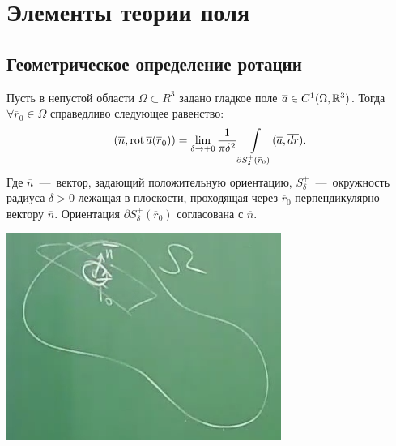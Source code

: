 \section{Элементы теории поля}
\subsection{Геометрическое определение ротации}
\noindent 
    \begin{minipage}{0.75\textwidth}
   \begin{theorem}
    Пусть в непустой области $\Omega \subset R^3$ задано гладкое поле $\overline{a} \in C^1 (\Omega, \mathbb{R}^3)$. Тогда $\forall \overline{r}_0 \in \Omega$ справедливо следующее равенство: \[ (\overline{n}, \operatorname{rot} \overline{a}(\overline{r}_0)) = \lim\limits_{\delta \rightarrow +0} \dfrac{1}{\pi \delta^2} \int\limits_{\partial S^+_\delta(\overline{r}_0)} (\overline{a}, \overline{dr}).\]
    Где $\overline{n}$~---~вектор, задающий положительную ориентацию, $S^+_\delta$~---~окружность радиуса $\delta > 0$ лежащая в плоскости, проходящая через $\overline{r}_0$ перпендикулярно вектору $\overline{n}$. Ориентация $\partial S^+_\delta(\overline{r}_0)$ согласована с $\overline{n}$.
\end{theorem}
       
    \end{minipage}
    \begin{minipage}{0.25\textwidth}
    \includegraphics[width=\textwidth]{images/rotor777.png}
    \end{minipage}


